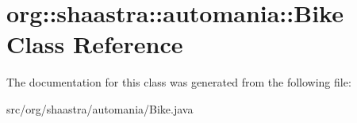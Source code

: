 \hypertarget{classorg_1_1shaastra_1_1automania_1_1Bike}{
\section{\-o\-r\-g\-:\-:\-s\-h\-a\-a\-s\-t\-r\-a\-:\-:\-a\-u\-t\-o\-m\-a\-n\-i\-a\-:\-:\-B\-i\-k\-e \-C\-l\-a\-s\-s \-R\-e\-f\-e\-r\-e\-n\-c\-e}
\label{classorg_1_1shaastra_1_1automania_1_1Bike}
}


The documentation for this class was generated from the following file:\begin{DoxyCompactItemize}
\item 
\-s\-r\-c\-/\-o\-r\-g\-/\-s\-h\-a\-a\-s\-t\-r\-a\-/\-a\-u\-t\-o\-m\-a\-n\-i\-a\-/\-B\-i\-k\-e\-.\-j\-a\-v\-a\end{DoxyCompactItemize}
